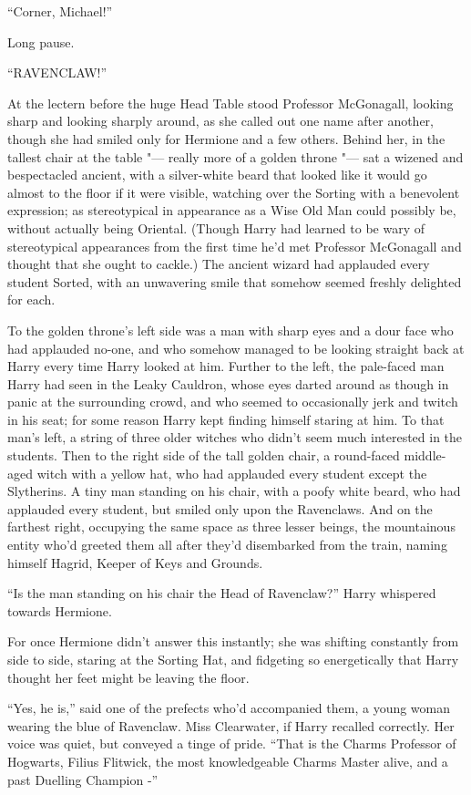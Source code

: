 ``Corner, Michael!''

Long pause.

``RAVENCLAW!''

At the lectern before the huge Head Table stood Professor McGonagall,
looking sharp and looking sharply around, as she called out one name
after another, though she had smiled only for Hermione and a few others.
Behind her, in the tallest chair at the table "--- really more of a golden
throne "--- sat a wizened and bespectacled ancient, with a silver-white
beard that looked like it would go almost to the floor if it were
visible, watching over the Sorting with a benevolent expression; as
stereotypical in appearance as a Wise Old Man could possibly be, without
actually being Oriental. (Though Harry had learned to be wary of
stereotypical appearances from the first time he'd met Professor
McGonagall and thought that she ought to cackle.) The ancient wizard had
applauded every student Sorted, with an unwavering smile that somehow
seemed freshly delighted for each.

To the golden throne's left side was a man with sharp eyes and a dour
face who had applauded no-one, and who somehow managed to be looking
straight back at Harry every time Harry looked at him. Further to the
left, the pale-faced man Harry had seen in the Leaky Cauldron, whose
eyes darted around as though in panic at the surrounding crowd, and who
seemed to occasionally jerk and twitch in his seat; for some reason
Harry kept finding himself staring at him. To that man's left, a string
of three older witches who didn't seem much interested in the students.
Then to the right side of the tall golden chair, a round-faced
middle-aged witch with a yellow hat, who had applauded every student
except the Slytherins. A tiny man standing on his chair, with a poofy
white beard, who had applauded every student, but smiled only upon the
Ravenclaws. And on the farthest right, occupying the same space as three
lesser beings, the mountainous entity who'd greeted them all after
they'd disembarked from the train, naming himself Hagrid, Keeper of Keys
and Grounds.

``Is the man standing on his chair the Head of Ravenclaw?'' Harry
whispered towards Hermione.

For once Hermione didn't answer this instantly; she was shifting
constantly from side to side, staring at the Sorting Hat, and fidgeting
so energetically that Harry thought her feet might be leaving the floor.

``Yes, he is,'' said one of the prefects who'd accompanied them, a young
woman wearing the blue of Ravenclaw. Miss Clearwater, if Harry recalled
correctly. Her voice was quiet, but conveyed a tinge of pride. ``That is
the Charms Professor of Hogwarts, Filius Flitwick, the most
knowledgeable Charms Master alive, and a past Duelling Champion -''


